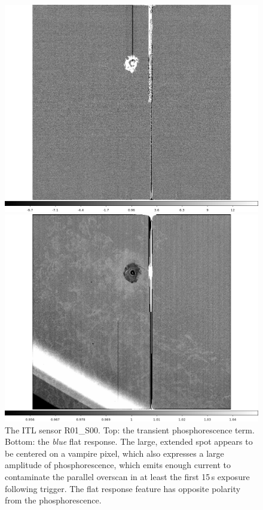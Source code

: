\begin{figure}[!htbp]
\centering
\begin{minipage}{1.0\textwidth}    
  \centering
  \includegraphics[width=.6\linewidth]{figures/phosphorescence-survey/stains_phos_R01_S00.png}    
\end{minipage}
\begin{minipage}{1.0\textwidth}
  \centering
  \includegraphics[width=.6\linewidth]{figures/phosphorescence-survey/stains_abs_R01_S00.png}
\end{minipage}
\caption{The ITL sensor R01\_S00. Top: the transient phosphorescence term. Bottom: the {\it blue} flat response. The large, extended spot appears to be centered on a vampire pixel, which also expresses a large amplitude of phosphorescence, which emits enough current to contaminate the parallel overscan in at least the first 15\,s exposure following trigger. The flat response feature has opposite polarity from the phosphorescence.}
\label{fig:phos:stains:R01S00}
\end{figure}


